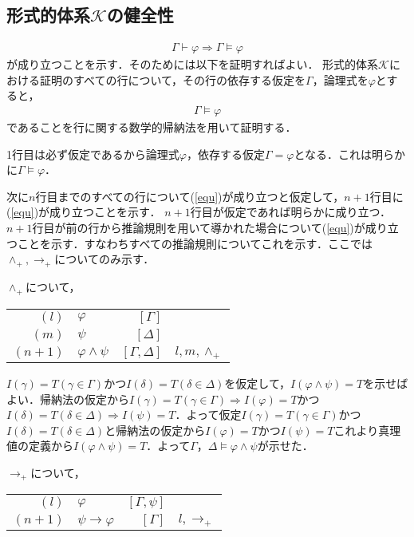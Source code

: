 \documentclass[10pt,b5paper,papersize,dvipdfmx]{jsbook}
\begin{document}
\subsection{形式的体系$\mathcal K$の健全性}
\begin{align}
  \Gamma \vdash \varphi \Rightarrow \Gamma \models \varphi
\end{align}
が成り立つことを示す．そのためには以下を証明すればよい．
形式的体系$\mathcal K$における証明のすべての行について，その行の依存する仮定を$\Gamma$，論理式を$\varphi$とすると，
\begin{align}
  \label{equ} \Gamma \models \varphi
\end{align}
であることを行に関する数学的帰納法を用いて証明する．\par
1行目は必ず仮定であるから論理式$\varphi$，依存する仮定$\Gamma = \varphi$となる．これは明らかに$\Gamma \models \varphi$． \par
次に$n$行目までのすべての行について(\ref{equ})が成り立つと仮定して，$n+1$行目に(\ref{equ})が成り立つことを示す．
$n+1$行目が仮定であれば明らかに成り立つ．$n+1$行目が前の行から推論規則を用いて導かれた場合について(\ref{equ})が成り立つことを示す．すなわちすべての推論規則についてこれを示す．ここでは$\land_+, \to_+$についてのみ示す．\par
$\land_+$について，
\begin{table}[H]
  \begin{tabular}{rlrl}
    $(l)$&$\varphi$&$[\Gamma]$& \\
    $(m)$&$\psi$&$[\Delta]$& \\
    $(n+1)$&$\varphi \land \psi$&$[\Gamma,\Delta]$&$l,m,\land_+$
  \end{tabular}
\end{table}
$I(\gamma)=T(\gamma \in \Gamma)$かつ$I(\delta)=T(\delta \in \Delta)$を仮定して，$I(\varphi \land \psi)=T$を示せばよい．帰納法の仮定から$I(\gamma)=T(\gamma \in \Gamma)\Rightarrow I(\varphi)=T$かつ$I(\delta)=T(\delta \in \Delta)\Rightarrow I(\psi)=T$．よって仮定$I(\gamma)=T(\gamma \in \Gamma)$かつ$I(\delta)=T(\delta \in \Delta)$と帰納法の仮定から$I(\varphi)=T$かつ$I(\psi)=T$これより真理値の定義から$I(\varphi \land \psi)=T$．よって$\Gamma，\Delta \models \varphi \land \psi$が示せた．\par
$\to_+$について，
\begin{table}[H]
  \begin{tabular}{rlrl}
    $(l)$&$\varphi$&$[\Gamma,\psi]$& \\
    $(n+1)$&$\psi \to \varphi$&$[\Gamma]$&$l,\to_+$ \\
  \end{tabular}
\end{table}
\end{document}
